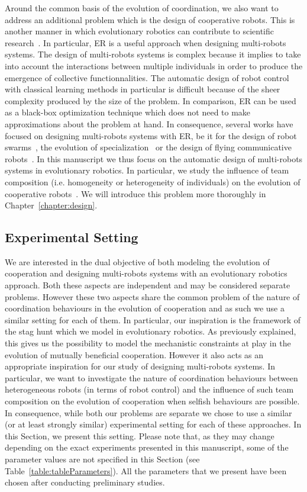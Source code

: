    Around the common basis of the evolution of coordination, we also want to address an additional problem which is the design of cooperative robots. This is another manner in which evolutionary robotics can contribute to scientific research~\parencite{Trianni2014b, Doncieux2015a}. In particular, ER is a useful approach when designing multi-robots systems. The design of multi-robots systems is complex because it implies to take into account the interactions between multiple individuals in order to produce the emergence of collective functionnalities. The automatic design of robot control with classical learning methods in particular is difficult because of the sheer complexity produced by the size of the problem. In comparison, ER can be used as a black-box optimization technique which does not need to make approximations about the problem at hand. In consequence, several works have focused on designing multi-robots systems with ER, be it for the design of robot swarms~\parencite{Baldassarre2007}, the evolution of specialization~\parencite{Ferrante2015} or the design of flying communicative robots~\parencite{Hauert2014}. In this manuscript we thus focus on the automatic design of multi-robots systems in evolutionary robotics. In particular, we study the influence of team composition (i.e. homogeneity or heterogeneity of individuals) on the evolution of cooperative robots~\parencite{Waibel2009}. We will introduce this problem more thoroughly in Chapter~\ref{chapter:design}.


  \subsection{Experimental Setting}

    We are interested in the dual objective of both modeling the evolution of cooperation and designing multi-robots systems with an evolutionary robotics approach. Both these aspects are independent and may be considered separate problems. However these two aspects share the common problem of the nature of coordination behaviours in the evolution of cooperation and as such we use a similar setting for each of them. In particular, our inspiration is the framework of the stag hunt which we model in evolutionary robotics. As previously explained, this gives us the possibility to model the mechanistic constraints at play in the evolution of mutually beneficial cooperation. However it also acts as an appropriate inspiration for our study of designing multi-robots systems. In particular, we want to investigate the nature of coordination behaviours between heterogeneous robots (in terms of robot control) and the influence of such team composition on the evolution of cooperation when selfish behaviours are possible. In consequence, while both our problems are separate we chose to use a similar (or at least strongly similar) experimental setting for each of these approaches. In this Section, we present this setting. Please note that, as they may change depending on the exact experiments presented in this manuscript, some of the parameter values are not specified in this Section (see Table~\ref{table:tableParameters}). All the parameters that we present have been chosen after conducting preliminary studies.

